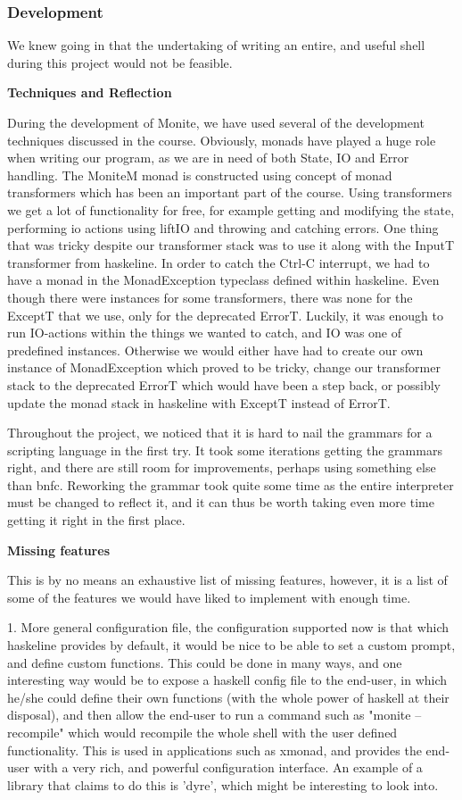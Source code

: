 \documentclass[11pt,a4paper]{article}
\begin{document}
\subsubsection{Development}

We knew going in that the undertaking of writing an entire, and useful shell
during this project would not be feasible.


\textbf{Techniques and Reflection}

During the development of Monite, we have used several of the development
techniques discussed in the course. Obviously, monads have played a huge role
when writing our program, as we are in need of both State, IO and Error
handling. The MoniteM monad is constructed using concept of monad transformers
which has been an important part of the course. Using transformers we get a lot
of functionality for free, for example getting and modifying the state,
performing io actions using liftIO and throwing and catching errors. One thing
that was tricky despite our transformer stack was to use it along with the
InputT transformer from haskeline. In order to catch the Ctrl-C interrupt, we
had to have a monad in the MonadException typeclass defined within haskeline.
Even though there were instances for some transformers, there was none for the
ExceptT that we use, only for the deprecated ErrorT. Luckily, it was enough to
run IO-actions within the things we wanted to catch, and IO was one of
predefined instances. Otherwise we would either have had to create our own
instance of MonadException which proved to be tricky, change our transformer
stack to the deprecated ErrorT which would have been a step back, or possibly
update the monad stack in haskeline with ExceptT instead of ErrorT.

Throughout the project, we noticed that it is hard to nail the grammars for a
scripting language in the first try. It took some iterations getting the
grammars right, and there are still room for improvements, perhaps using
something else than bnfc. Reworking the grammar took quite some time as the
entire interpreter must be changed to reflect it, and it can thus be worth
taking even more time getting it right in the first place.

\textbf{Missing features}

This is by no means an exhaustive list of missing features, however, it is a
list of some of the features we would have liked to implement with enough time.

1. More general configuration file, the configuration supported now is that
which haskeline provides by default, it would be nice to be able to set a custom
prompt, and define custom functions. This could be done in many ways, and one
interesting way would be to expose a haskell config file to the end-user, in
which he/she could define their own functions (with the whole power of haskell
at their disposal), and then allow the end-user to run a command such as "monite
--recompile" which would recompile the whole shell with the user defined
functionality. This is used in applications such as xmonad, and provides the
end-user with a very rich, and powerful configuration interface. An example of a
library that claims to do this is 'dyre', which might be interesting to look
into.
\end{document}
